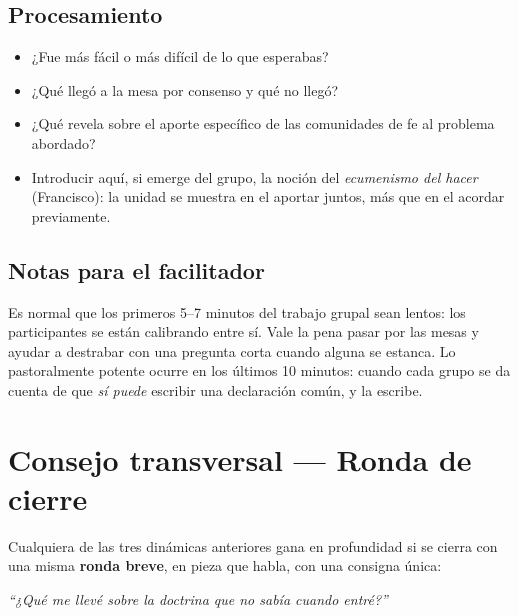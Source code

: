 \documentclass[11pt, a4paper]{article}
\begin{document}
\begin{actividad}
\subsection*{Procesamiento}
\begin{itemize}
  \item ¿Fue más fácil o más difícil de lo que esperabas?
  \item ¿Qué llegó a la mesa por consenso y qué no llegó?
  \item ¿Qué revela sobre el aporte específico de las comunidades de fe al problema abordado?
  \item Introducir aquí, si emerge del grupo, la noción del \emph{ecumenismo del hacer} (Francisco): la unidad se muestra en el aportar juntos, más que en el acordar previamente.
\end{itemize}

\subsection*{Notas para el facilitador}
Es normal que los primeros 5--7 minutos del trabajo grupal sean lentos: los participantes se están calibrando entre sí. Vale la pena pasar por las mesas y ayudar a destrabar con una pregunta corta cuando alguna se estanca. Lo pastoralmente potente ocurre en los últimos 10 minutos: cuando cada grupo se da cuenta de que \emph{sí puede} escribir una declaración común, y la escribe.

\end{actividad}

\newpage

\section*{Consejo transversal --- Ronda de cierre}

Cualquiera de las tres dinámicas anteriores gana en profundidad si se cierra con una misma \textbf{ronda breve}, en pieza que habla, con una consigna única:

\vspace{0.5em}

\begin{center}
\begin{tcolorbox}[
  enhanced, colback=doctrinaAzul, colframe=doctrinaAzul,
  boxrule=0pt, arc=3pt,
  left=18pt, right=18pt, top=16pt, bottom=16pt,
  width=0.86\linewidth,
  halign=center
]
  {\color{parch}\itshape\large ``¿Qué me llevé sobre la doctrina que no sabía cuando entré?''}
\end{tcolorbox}
\end{center}
\end{document}
